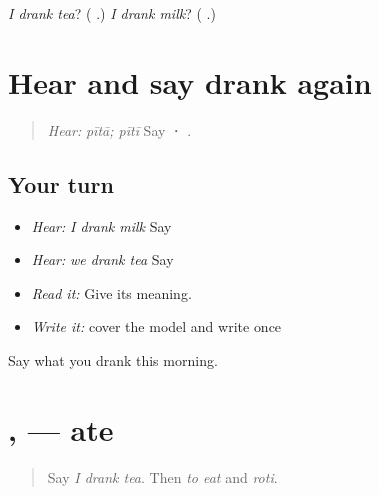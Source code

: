 \begin{tcolorbox}[breakable,colback=teal!4,colframe=teal!35!black,title={Before you move on}]
\emph{I drank tea}? (\textbf{  }.) \emph{I drank milk}? (\textbf{  }.)
\end{tcolorbox}
\section[\texorpdfstring{\pa{ਪੀਤਾ} · \pa{ਪੀਤੀ} (pītā · pītī)}{ਪੀਤਾ · ਪੀਤੀ (pītā · pītī)}]{Hear and say drank again}

\label{lesson:PA-C219-pita-review}



\begin{quote}
\emph{Hear:} \emph{pītā; pītī} Say \textbf{ · }.
\end{quote}

\subsection*{Your turn}
\begin{itemize}
\raggedright
  \item \emph{Hear:} \emph{I drank milk} Say \textbf{  }
  \item \emph{Hear:} \emph{we drank tea} Say \textbf{  }
  \item \emph{Read it:} \textbf{  } Give its meaning.
  \item \emph{Write it:} cover the model and write \textbf{  } once
\end{itemize}

\begin{tcolorbox}[breakable,colback=teal!4,colframe=teal!35!black,title={Before you move on}]
Say what you drank this morning.
\end{tcolorbox}
\section[\texorpdfstring{\pa{ਖਾਧਾ} · \pa{ਖਾਧੀ} (khādhā · khādhī)}{ਖਾਧਾ · ਖਾਧੀ (khādhā · khādhī)}]{,  — ate}

\label{lesson:PA-C219-khadha}



\begin{quote}
Say \emph{I drank tea}. Then \emph{to eat} and \emph{roti}.
\end{quote}

